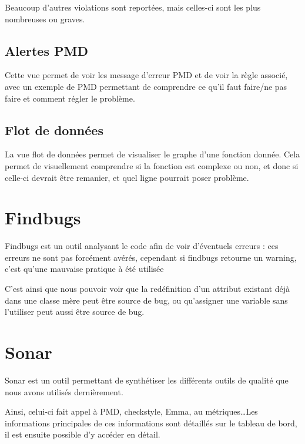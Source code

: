 \documentclass[12pt,a4paper,openany]{book}
\begin{document}
Beaucoup d'autres violations sont reportées, mais celles-ci sont les plus nombreuses ou graves.

\section{Alertes PMD}
Cette vue permet de voir les message d'erreur PMD et de voir la règle associé, avec un exemple de PMD permettant de comprendre ce qu'il faut faire/ne
pas faire et comment régler le problème.
\section{Flot de données}
La vue flot de données permet de visualiser le graphe d'une fonction donnée. Cela permet de visuellement comprendre si la fonction est complexe ou non,
et donc si celle-ci devrait être remanier, et quel ligne pourrait poser problème.

\chapter{Findbugs}
Findbugs est un outil analysant le code afin de voir d'éventuels erreurs : ces erreurs ne sont pas forcément avérés, cependant si findbugs retourne un
warning, c'est qu'une mauvaise pratique à été utilisée

C'est ainsi que nous pouvoir voir que la redéfinition d'un attribut existant déjà dans une classe mère peut être source de bug, ou qu'assigner une
variable sans l'utiliser peut aussi être source de bug. 

\chapter{Sonar}
Sonar est un outil permettant de synthétiser les différents outils de qualité que nous avons utilisés dernièrement.

Ainsi, celui-ci fait appel à PMD, checkstyle, Emma, au métriques\ldots Les informations principales de ces informations sont détaillés sur le tableau de
bord, il est ensuite possible d'y accéder en détail.
\end{document}

